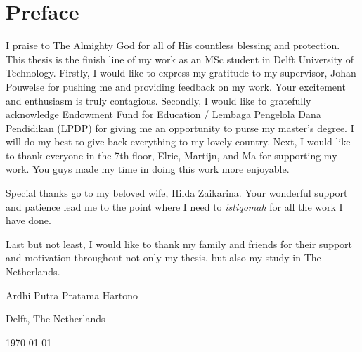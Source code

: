 \chapter*{Preface}
\vspace{1\baselineskip}

\noindent
I praise to The Almighty God for all of His countless blessing and protection.\\

This thesis is the finish line of my work as an MSc student in Delft University of Technology. Firstly, I would like to express my gratitude to my supervisor, Johan Pouwelse for pushing me and providing feedback on my work. Your excitement and enthusiasm is truly contagious. Secondly, I would like to gratefully acknowledge Endowment Fund for Education / Lembaga Pengelola Dana Pendidikan (LPDP) for giving me an opportunity to purse my master's degree. I will do my best to give back everything to my lovely country. Next, I would like to thank everyone in the 7th floor, Elric, Martijn, and Ma for supporting my work. You guys made my time in doing this work more enjoyable. 

Special thanks go to my beloved wife, Hilda Zaikarina. Your wonderful support and patience lead me to the point where I need to \textit{istiqomah} for all the work I have done. 

Last but not least, I would like to thank my family and friends for their support and motivation throughout not only my thesis, but also my study in The Netherlands. 

\vspace{1\baselineskip}

\noindent
Ardhi Putra Pratama Hartono

\vspace{1\baselineskip}

\noindent
Delft, The Netherlands

\noindent
\today
